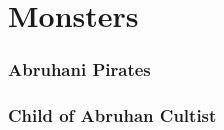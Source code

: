 
\section{Monsters}


\begin{multicols*}{2}

\subsubsection*{Abruhani Pirates}

\subsubsection*{Child of Abruhan Cultist}








\end{multicols*}
